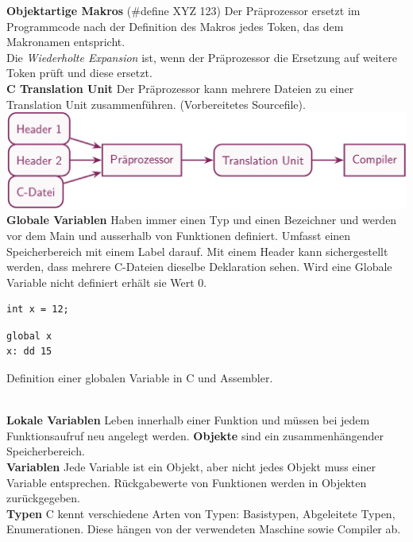 \documentclass[7pt,landscape,a4paper]{scrartcl}
\begin{document}
\begin{multicols*}{4}
\textbf{Objektartige Makros} (\#define XYZ 123) Der Präprozessor ersetzt im Programmcode nach der Definition des Makros jedes Token, das dem Makronamen entspricht.\\
Die \textit{Wiederholte Expansion} ist, wenn der Präprozessor die Ersetzung auf weitere Token prüft und diese ersetzt.\\
\textbf{C Translation Unit}
Der Präprozessor kann mehrere Dateien zu einer Translation Unit zusammenführen. (Vorbereitetes Sourcefile).
\includegraphics[width=0.75\linewidth]{translationunit}\\
\textbf{Globale Variablen}
Haben immer einen Typ und einen Bezeichner und werden vor dem Main und ausserhalb von Funktionen definiert. Umfasst einen Speicherbereich mit einem Label darauf. Mit einem Header kann sichergestellt werden, dass mehrere C-Dateien dieselbe Deklaration sehen. Wird eine Globale Variable nicht definiert erhält sie Wert 0.\\
\begin{minipage}[b]{0,3\linewidth}
\begin{verbatim}
int x = 12;
\end{verbatim}
\end{minipage}
\begin{minipage}[b]{0,3\linewidth}
\begin{verbatim}
global x
x: dd 15
\end{verbatim}
\end{minipage}
\begin{minipage}[b]{0,3\linewidth}
Definition einer globalen Variable in C und Assembler.
\end{minipage}\\
\textbf{Lokale Variablen} Leben innerhalb einer Funktion und müssen bei jedem Funktionsaufruf neu angelegt werden.
\textbf{Objekte} sind ein zusammenhängender Speicherbereich.\\
\textbf{Variablen} Jede Variable ist ein Objekt, aber nicht jedes Objekt muss einer Variable entsprechen. Rückgabewerte von Funktionen werden in Objekten zurückgegeben. \\
\textbf{Typen} C kennt verschiedene Arten von Typen: Basistypen, Abgeleitete Typen, Enumerationen. Diese hängen von der verwendeten Maschine sowie Compiler ab.\\

\end{multicols*}
\end{document}
